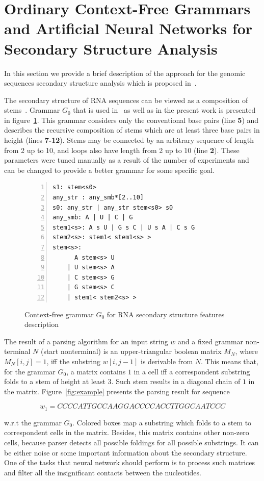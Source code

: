 \section{Ordinary Context-Free Grammars and Artificial Neural Networks for Secondary Structure Analysis}

In this section we provide a brief description of the approach for the genomic sequences secondary structure analysis which is proposed in~\cite{grigorevcomposition}.

The secondary structure of RNA sequences can be viewed as a composition of stems~\cite{MQbioinformatics19}.
Grammar $G_0$ that is used in~\cite{grigorevcomposition} as well as in the present work is presented in figure~\ref{gram}.
This grammar considers only the conventional base pairs (line \textbf{5}) and describes the recursive composition of stems which are at least three base pairs in height (lines \textbf{7-12}).
Stems may be connected by an arbitrary sequence of length from 2 up to 10, and loops also have length from 2 up to 10 (line \textbf{2}).
These parameters were tuned manually as a result of the number of experiments and can be changed to provide a better grammar for some specific goal.

\begin{figure}
\begin{Verbatim}[numbers=left,xleftmargin=5mm]
s1: stem<s0>
any_str : any_smb*[2..10]
s0: any_str | any_str stem<s0> s0
any_smb: A | U | C | G
stem1<s>: A s U | G s C | U s A | C s G 
stem2<s>: stem1< stem1<s> >
stem<s>:  
      A stem<s> U 
    | U stem<s> A 
    | C stem<s> G 
    | G stem<s> C 
    | stem1< stem2<s> >  
\end{Verbatim}
\caption{Context-free grammar $G_0$ for RNA secondary structure features description}
\label{gram}
\end{figure}

The result of a parsing algorithm for an input string $w$ and a fixed grammar non-terminal $N$ (start nonterminal) is an upper-triangular boolean matrix $M_N$, where $M_N [i,j] = 1$, iff the substring $w[i,j-1]$ is derivable from $N$.
This means that, for the grammar $G_0$, a matrix contains $1$ in a cell iff a correspondent substring folds to a  stem of height at least 3.
Such stem results in a diagonal chain of $1$ in the matrix.
Figure~\ref{fig:example} presents the parsing result for sequence

\[
w_1 = CCCCATTGCCAAGGACCCCACCTTGGCAATCCC
\]

w.r.t the grammar $G_0$.
Colored boxes map a substring which folds to a stem to correspondent cells in the matrix. 
Besides, this matrix contains other non-zero cells, because parser detects all possible foldings for all possible substrings. 
It can be either noise or some important information about the secondary structure. 
One of the tasks that neural network should perform is to process such matrices and filter all the insignificant contacts between the nucleotides.

